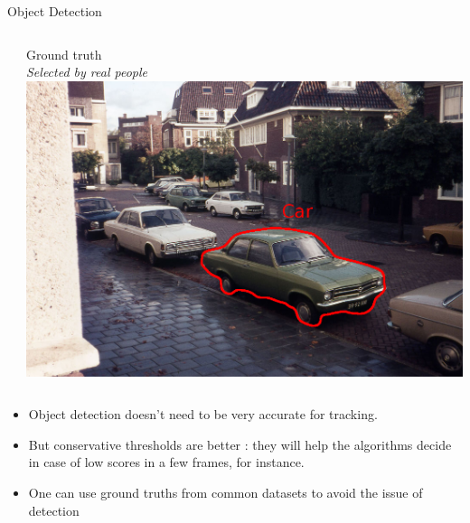 \documentclass[final]{beamer}
\begin{document}
\begin{frame}
\begin{block}{\huge Object Detection}
\begin{columns}
\begin{column}{.30\textwidth}
        \end{column}
        \begin{column}{.30\textwidth}
          \centering
          Ground truth\\
          \emph{Selected by real people}
          \vskip5mm
          \includegraphics[width=0.95\linewidth]{figures/detection-ground.png}
        \end{column}
      \end{columns}
      \vskip5mm
      \begin{itemize}
        \item Object detection doesn't need to be very accurate for tracking.
        \item But conservative thresholds are better : they will help the algorithms decide in case of low scores in a few frames, for instance.
        \item One can use ground truths from common datasets to avoid the issue of detection
      \end{itemize}
    \end{block}
  \end{frame}
\end{document}
